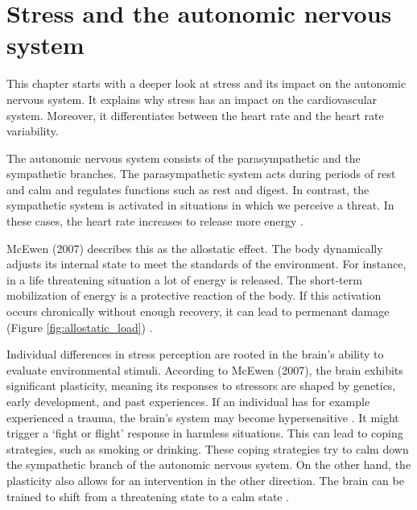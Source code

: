 



\section{Stress and the autonomic nervous system}


This chapter starts with a deeper look  at stress and its impact on the autonomic nervous system. It explains why stress has an impact on the cardiovascular system. Moreover, it differentiates between the heart rate and the heart rate variability.

The autonomic nervous system consists of the parasympathetic and the sympathetic branches. The parasympathetic system acts during periods of rest and calm and regulates functions such as rest and digest. In contrast, the sympathetic system is activated in situations in which we perceive a threat. In these cases, the heart rate increases to release more energy \cite{mccorry2007physiology}.

McEwen (2007) describes this as the allostatic effect. The body dynamically adjusts its internal state to meet the standards of the environment. For instance, in a life threatening situation a lot of energy is released. The short-term mobilization of energy is a protective reaction of the body. If this activation occurs chronically without enough recovery, it can lead to permenant damage (Figure \ref{fig:allostatic_load}) \cite{mcewen2017neurobiology}.

Individual differences in stress perception are rooted in the brain's ability to evaluate environmental stimuli. According to McEwen (2007), the brain exhibits significant plasticity, meaning its responses to stressors are shaped by genetics, early development, and past experiences. If an individual has for example experienced a trauma, the brain’s system may become hypersensitive \cite{mcewen2017neurobiology}. It might trigger a ‘fight or flight’ response in harmless situations\cite{mccorry2007physiology}. This can lead to coping strategies, such as smoking or drinking. These coping strategies try to calm down the sympathetic branch of the autonomic nervous system. On the other hand, the plasticity also allows for an intervention in the other direction. The brain can be trained to shift from a threatening state to a calm state \cite{mcewen2017neurobiology}.

